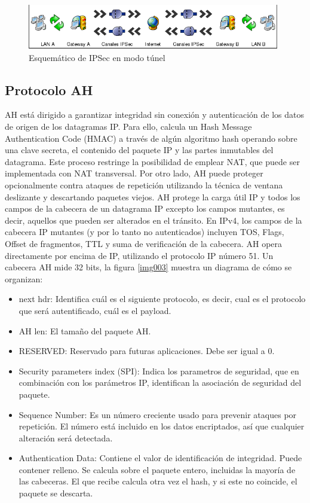 \documentclass[a4paper,10pt]{article}
\begin{document}
	\begin{figure}[!htb]
		\centering
		\includegraphics[width=11cm]{Imagenes/ipSecModoTunel.png}
		\caption{Esquemático de IPSec en modo t\'unel} \label{img002}
	\end{figure}

		\subsection{Protocolo AH}
	\indent AH está dirigido a garantizar integridad sin conexión y autenticación de los datos de origen de los datagramas IP. Para ello, calcula un Hash Message Authentication Code (HMAC) a través de algún algoritmo hash operando sobre una clave secreta, el contenido del paquete IP y las partes inmutables del datagrama. Este proceso restringe la posibilidad de emplear NAT, que puede ser implementada con NAT transversal. Por otro lado, AH puede proteger opcionalmente contra ataques de repetición utilizando la técnica de ventana deslizante y descartando paquetes viejos. AH protege la carga útil IP y todos los campos de la cabecera de un datagrama IP excepto los campos mutantes, es decir, aquellos que pueden ser alterados en el tránsito. En IPv4, los campos de la cabecera IP mutantes (y por lo tanto no autenticados) incluyen TOS, Flags, Offset de fragmentos, TTL y suma de verificación de la cabecera. AH opera directamente por encima de IP, utilizando el protocolo IP número 51. Un cabecera AH mide 32 bits, la figura \ref{img003} muestra un diagrama de cómo se organizan:
	
	\begin{itemize}
		\item next hdr: Identifica cuál es el siguiente protocolo, es decir, cual es el protocolo que será autentificado, cuál es el payload.
		\item AH len: El tamaño del paquete AH.
		\item RESERVED: Reservado para futuras aplicaciones. Debe ser igual a 0.
		\item Security parameters index (SPI): Indica los parametros de seguridad, que en combinación con los parámetros IP, identifican la asociación de seguridad del paquete.
		\item Sequence Number: Es un número creciente usado para prevenir ataques por repetición. El número está incluido en los datos encriptados, así que cualquier alteración será detectada.
		\item Authentication Data: Contiene el valor de identificación de integridad. Puede contener relleno. Se calcula sobre el paquete entero, incluidas la mayoría de las cabeceras. El que recibe calcula otra vez el hash, y si este no coincide, el paquete se descarta.
	\end{itemize}		
	
\end{document}
